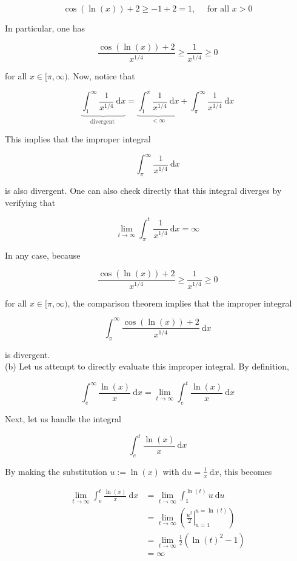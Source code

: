 \documentclass[10pt]{article}
\begin{document}
$$
\cos (\ln (x))+2 \geq-1+2=1, \quad \text { for all } x>0
$$

In particular, one has

$$
\frac{\cos (\ln (x))+2}{x^{1 / 4}} \geq \frac{1}{x^{1 / 4}} \geq 0
$$

for all $x \in[\pi, \infty)$. Now, notice that

$$
\underbrace{\int_{1}^{\infty} \frac{1}{x^{1 / 4}} \mathrm{~d} x}_{\text {divergent }}=\underbrace{\int_{1}^{\pi} \frac{1}{x^{1 / 4}} \mathrm{~d} x}_{<\infty}+\int_{\pi}^{\infty} \frac{1}{x^{1 / 4}} \mathrm{~d} x
$$

This implies that the improper integral

$$
\int_{\pi}^{\infty} \frac{1}{x^{1 / 4}} \mathrm{~d} x
$$

is also divergent. One can also check directly that this integral diverges by verifying that

$$
\lim _{t \rightarrow \infty} \int_{\pi}^{t} \frac{1}{x^{1 / 4}} \mathrm{~d} x=\infty
$$

In any case, because

$$
\frac{\cos (\ln (x))+2}{x^{1 / 4}} \geq \frac{1}{x^{1 / 4}} \geq 0
$$

for all $x \in[\pi, \infty)$, the comparison theorem implies that the improper integral

$$
\int_{\pi}^{\infty} \frac{\cos (\ln (x))+2}{x^{1 / 4}} \mathrm{~d} x
$$

is divergent.\\
(b) Let us attempt to directly evaluate this improper integral. By definition,

$$
\int_{e}^{\infty} \frac{\ln (x)}{x} \mathrm{~d} x=\lim _{t \rightarrow \infty} \int_{e}^{t} \frac{\ln (x)}{x} \mathrm{~d} x
$$

Next, let us handle the integral

$$
\int_{e}^{t} \frac{\ln (x)}{x} \mathrm{~d} x
$$

By making the substitution $u:=\ln (x)$ with $\mathrm{d} u=\frac{1}{x} \mathrm{~d} x$, this becomes

$$
\begin{aligned}
\lim _{t \rightarrow \infty} \int_{e}^{t} \frac{\ln (x)}{x} \mathrm{~d} x & =\lim _{t \rightarrow \infty} \int_{1}^{\ln (t)} u \mathrm{~d} u \\
& =\lim _{t \rightarrow \infty}\left(\left.\frac{u^{2}}{2}\right|_{u=1} ^{u=\ln (t)}\right) \\
& =\lim _{t \rightarrow \infty} \frac{1}{2}\left(\ln (t)^{2}-1\right) \\
& =\infty
\end{aligned}
$$
\end{document}
